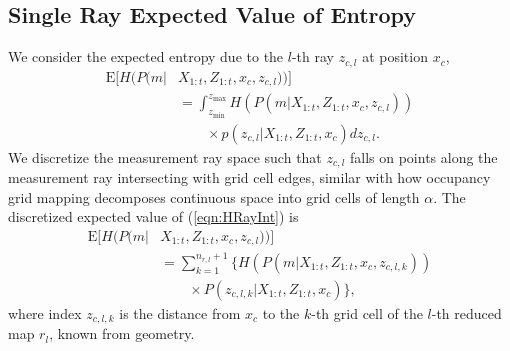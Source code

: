 \documentclass[letterpaper, 10pt]{ieeeconf}
\newcommand{\refeqn}[1]{(\ref{eqn:#1})}
\begin{document}
\subsection{Single Ray Expected Value of Entropy}
We consider the expected entropy due to the $l$-th ray $z_{c,l}$ at position $x_c$,
\begin{align}
\label{eqn:HRayInt}
\text{E}[H(P(m|&X_{1:t},Z_{1:t},x_c,z_{c,l}))]
\nonumber\\&
=\int_{z_\text{min}}^{z_\text{max}}
H(P(m|X_{1:t},Z_{1:t},x_c,z_{c,l}))\nonumber\\&\qquad\times p(z_{c,l}|X_{1:t},Z_{1:t},x_c)
dz_{c,l}.
\end{align}
We discretize the measurement ray space such that $z_{c,l}$ falls on points along the measurement ray intersecting with grid cell edges, similar with how occupancy grid mapping decomposes continuous space into grid cells of length $\alpha$.
The discretized expected value of \refeqn{HRayInt} is
\begin{align}
\label{eqn:DiscExpEntropyRay}
\text{E}[H(P(m|&X_{1:t},Z_{1:t},x_c,z_{c,l}))]
\nonumber\\&=\sum_{k=1}^{n_{r,l}+1}\bigg\{H(P(m|X_{1:t},Z_{1:t},x_c,z_{c,l,k}))\nonumber\\&\qquad\times P(z_{c,l,k}|X_{1:t},Z_{1:t},x_c)\bigg\},
\end{align}
where index $z_{c,l,k}$ is the distance from $x_c$ to the $k$-th grid cell of the $l$-th reduced map $r_l$, known from geometry.
\end{document}
